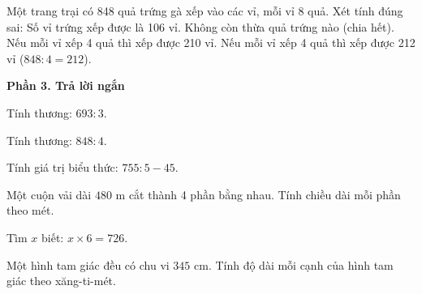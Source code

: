 \begin{ex} %
Một trang trại có 848 quả trứng gà xếp vào các vỉ, mỗi vỉ 8 quả. Xét tính đúng sai:
\choiceTF
{\True Số vỉ trứng xếp được là 106 vỉ.}
{\True Không còn thừa quả trứng nào (chia hết).}
{Nếu mỗi vỉ xếp 4 quả thì xếp được 210 vỉ.}
{\True Nếu mỗi vỉ xếp 4 quả thì xếp được 212 vỉ ($848 : 4 = 212$).}
\end{ex}

\textbf{Phần 3. Trả lời ngắn}

\begin{ex} %
Tính thương: $693 : 3$.
\end{ex}

\begin{ex} %
Tính thương: $848 : 4$.
\end{ex}

\begin{ex} %
Tính giá trị biểu thức: $755 : 5 - 45$.
\end{ex}

\begin{ex} %
Một cuộn vải dài $480\text{ m}$ cắt thành 4 phần bằng nhau. Tính chiều dài mỗi phần theo mét.
\end{ex}

\begin{ex} %
Tìm $x$ biết: $x \times 6 = 726$.
\end{ex}

\begin{ex} %
Một hình tam giác đều có chu vi $345\text{ cm}$. Tính độ dài mỗi cạnh của hình tam giác theo xăng-ti-mét.
\end{ex}

